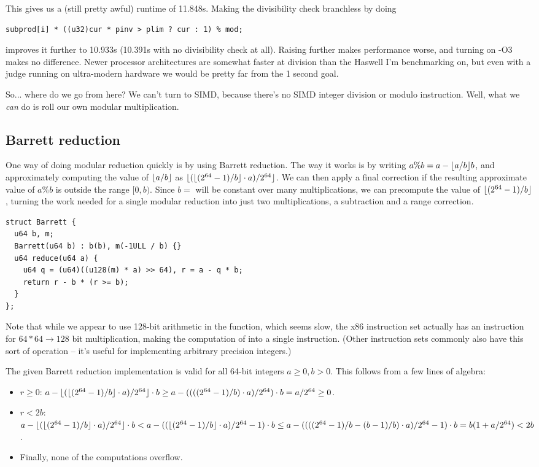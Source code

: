 This gives us a (still pretty awful) runtime of 11.848s.
Making the divisibility check branchless by doing
\begin{lstlisting}
subprod[i] * ((u32)cur * pinv > plim ? cur : 1) % mod;
\end{lstlisting}
improves it further to 10.933s (10.391s with no divisibility check at all).
Raising \verb@PAR@ further makes performance worse, and turning on -O3 makes no difference.
Newer processor architectures are somewhat faster at division than the Haswell I'm benchmarking on, but even with a judge running on ultra-modern hardware we would be pretty far from the 1 second goal.

So... where do we go from here?
We can't turn to SIMD, because there's no SIMD integer division or modulo instruction.
Well, what we \emph{can} do is roll our own modular multiplication.

\subsection{Barrett reduction}
One way of doing modular reduction quickly is by using Barrett reduction.
The way it works is by writing $a \% b = a - \lfloor a / b\rfloor b$, and approximately computing the value of $\lfloor a / b\rfloor$ as $\lfloor(\lfloor(2^{64} - 1) / b\rfloor \cdot a) / 2^{64}\rfloor$.
We can then apply a final correction if the resulting approximate value of $a \% b$ is outside the range $[0, b)$.
Since $b =$ \verb@mod@ will be constant over many multiplications, we can precompute the value of $\lfloor(2^{64} - 1) / b\rfloor$, turning the work needed for a single modular reduction into just two multiplications, a subtraction and a range correction.
\begin{lstlisting}
struct Barrett {
  u64 b, m;
  Barrett(u64 b) : b(b), m(-1ULL / b) {}
  u64 reduce(u64 a) {
    u64 q = (u64)((u128(m) * a) >> 64), r = a - q * b;
    return r - b * (r >= b);
  }
};
\end{lstlisting}

Note that while we appear to use 128-bit arithmetic in the \verb@reduce@ function, which seems slow, the x86 instruction set actually has an instruction for \mbox{$64*64\rightarrow128$} bit multiplication, making the computation of \verb@q@ into a single instruction.
(Other instruction sets commonly also have this sort of operation -- it's useful for implementing arbitrary precision integers.)

The given Barrett reduction implementation is valid for all 64-bit integers $a \ge 0, b > 0$. This follows from a few lines of algebra:
\begin{itemize}
\item $r \ge 0$: $a - \lfloor(\lfloor (2^{64} - 1) / b\rfloor \cdot a)/2^{64}\rfloor \cdot b \ge a - ((((2^{64} - 1) / b) \cdot a)/2^{64}) \cdot b = a / 2^{64} \ge 0$.
\item $r < 2b$: $a - \lfloor(\lfloor (2^{64} - 1) / b\rfloor \cdot a)/2^{64}\rfloor \cdot b < a - ((\lfloor (2^{64} - 1) / b\rfloor \cdot a)/2^{64} - 1) \cdot b \le a - ((((2^{64} - 1) / b - (b - 1) / b) \cdot a)/2^{64} - 1) \cdot b = b (1 + a/2^{64}) < 2b$.
\item Finally, none of the computations overflow.
\end{itemize}

